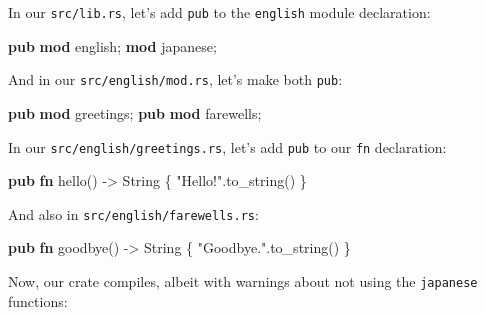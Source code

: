 \documentclass[a4paper,]{book}
\newenvironment{Shaded}{\begin{snugshade}}{\end{snugshade}}
\newcommand{\KeywordTok}[1]{\textcolor[rgb]{0.13,0.29,0.53}{\textbf{{#1}}}}
\newcommand{\StringTok}[1]{\textcolor[rgb]{0.31,0.60,0.02}{{#1}}}
\newcommand{\NormalTok}[1]{{#1}}
\begin{document}
In our \texttt{src/lib.rs}, let's add \texttt{pub} to the
\texttt{english} module declaration:

\begin{Shaded}
\begin{Highlighting}[]
\KeywordTok{pub} \KeywordTok{mod} \NormalTok{english;}
\KeywordTok{mod} \NormalTok{japanese;}
\end{Highlighting}
\end{Shaded}

And in our \texttt{src/english/mod.rs}, let's make both \texttt{pub}:

\begin{Shaded}
\begin{Highlighting}[]
\KeywordTok{pub} \KeywordTok{mod} \NormalTok{greetings;}
\KeywordTok{pub} \KeywordTok{mod} \NormalTok{farewells;}
\end{Highlighting}
\end{Shaded}

In our \texttt{src/english/greetings.rs}, let's add \texttt{pub} to our
\texttt{fn} declaration:

\begin{Shaded}
\begin{Highlighting}[]
\KeywordTok{pub} \KeywordTok{fn} \NormalTok{hello() -> String \{}
    \StringTok{"Hello!"}\NormalTok{.to_string()}
\NormalTok{\}}
\end{Highlighting}
\end{Shaded}

And also in \texttt{src/english/farewells.rs}:

\begin{Shaded}
\begin{Highlighting}[]
\KeywordTok{pub} \KeywordTok{fn} \NormalTok{goodbye() -> String \{}
    \StringTok{"Goodbye."}\NormalTok{.to_string()}
\NormalTok{\}}
\end{Highlighting}
\end{Shaded}

Now, our crate compiles, albeit with warnings about not using the
\texttt{japanese} functions:
\end{document}
